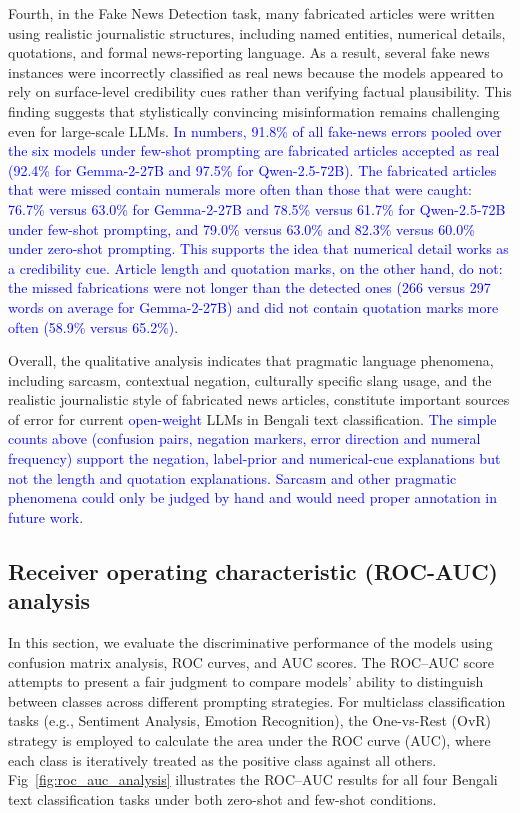 \documentclass[10pt,letterpaper]{article}
\newcommand{\rev}[1]{\textcolor{blue}{#1}}
\begin{document}
Fourth, in the Fake News Detection task, many fabricated articles were written using realistic journalistic structures, including named entities, numerical details, quotations, and formal news-reporting language. As a result, several fake news instances were incorrectly classified as real news because the models appeared to rely on surface-level credibility cues rather than verifying factual plausibility. This finding suggests that stylistically convincing misinformation remains challenging even for large-scale LLMs. \rev{In numbers, 91.8\% of all fake-news errors pooled over the six models under few-shot prompting are fabricated articles accepted as real (92.4\% for Gemma-2-27B and 97.5\% for Qwen-2.5-72B). The fabricated articles that were missed contain numerals more often than those that were caught: 76.7\% versus 63.0\% for Gemma-2-27B and 78.5\% versus 61.7\% for Qwen-2.5-72B under few-shot prompting, and 79.0\% versus 63.0\% and 82.3\% versus 60.0\% under zero-shot prompting. This supports the idea that numerical detail works as a credibility cue. Article length and quotation marks, on the other hand, do not: the missed fabrications were not longer than the detected ones (266 versus 297 words on average for Gemma-2-27B) and did not contain quotation marks more often (58.9\% versus 65.2\%).}

Overall, the qualitative analysis indicates that pragmatic language phenomena, including sarcasm, contextual negation, culturally specific slang usage, and the realistic journalistic style of fabricated news articles, constitute important sources of error for current \rev{open-weight} LLMs in Bengali text classification. \rev{The simple counts above (confusion pairs, negation markers, error direction and numeral frequency) support the negation, label-prior and numerical-cue explanations but not the length and quotation explanations. Sarcasm and other pragmatic phenomena could only be judged by hand and would need proper annotation in future work.}




\subsection*{Receiver operating characteristic (ROC-AUC) analysis}
\label{sec:roc_auc_analysis}

In this section, we evaluate the discriminative performance of the models using confusion matrix analysis, ROC curves, and AUC scores. The ROC–AUC score attempts to present a fair judgment to compare models' ability to distinguish between classes across different prompting strategies. For multiclass classification tasks (e.g., Sentiment Analysis, Emotion Recognition), the One-vs-Rest (OvR) strategy is employed to calculate the area under the ROC curve (AUC), where each class is iteratively treated as the positive class against all others. Fig~\ref{fig:roc_auc_analysis} illustrates the ROC–AUC results for all four Bengali text classification tasks under both zero-shot and few-shot conditions.
\end{document}
